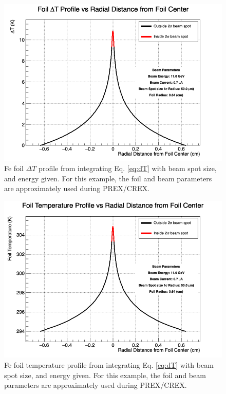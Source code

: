 \documentclass[12pt]{article}
\begin{document}
\begin{figure}[h]
\centering
\includegraphics[width=0.9\linewidth]{FoilHeatingdT.png}
\caption{\label{fig:foilheating}Fe foil $\Delta T$ profile from integrating Eq. \ref{eq:dT} with beam spot size, and energy given. For this example, the foil and beam parameters are approximately used during PREX/CREX.}
\end{figure}
\begin{figure}[h]
\centering
\includegraphics[width=0.9\linewidth]{FoilHeatingT.png}
\caption{\label{fig:foilheatingT}Fe foil temperature profile from integrating Eq. \ref{eq:dT} with beam spot size, and energy given. For this example, the foil and beam parameters are approximately used during PREX/CREX.}
\end{figure}

\FloatBarrier
\newpage
\end{document}
